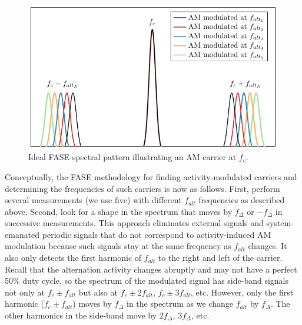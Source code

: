 \begin{figure}[tbh]
  \centering
    \includegraphics[width=\textwidth]{../fase/Data/ideal_fase.pdf}
  \caption{Ideal FASE spectral pattern illustrating an AM carrier at $f_c$.}
  \label{ideal_fase}
\end{figure}

Conceptually, the FASE methodology for finding activity-modulated carriers and determining the frequencies of such carriers is now as follows. First, perform several measurements (we use five) with different $f_{alt}$ frequencies as described above. Second, look for a shape in the spectrum that moves by $f_\Delta$ or $-f_\Delta$ in successive measurements. This approach eliminates external signals and system-emanated periodic signals that do not correspond to activity-induced AM modulation because such signals stay at the same frequency as $f_{alt}$ changes. It also only detects the first harmonic of $f_{alt}$ to the right and left of the carrier. Recall that the alternation activity changes abruptly and may not have a perfect 50\% duty cycle, so the spectrum of the modulated signal has side-band signals not only at $f_c \pm f_{alt}$ but also at $f_c \pm 2f_{alt}$, $f_c \pm 3f_{alt}$, etc. However, only the first harmonic ($f_c \pm f_{alt}$) moves by $f_\Delta$ in the spectrum as we change $f_{alt}$ by $f_\Delta$. The other harmonics in the side-band move by $2f_\Delta$, $3f_\Delta$, etc.

